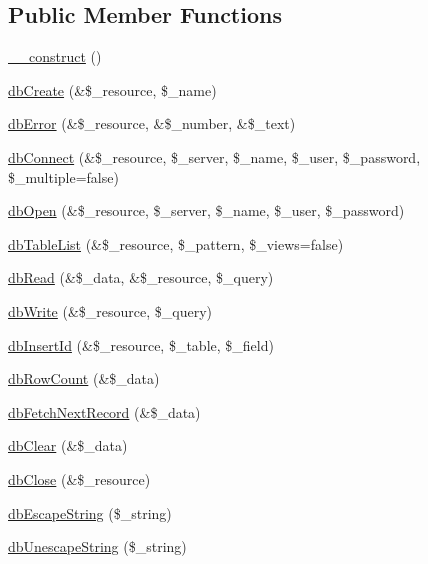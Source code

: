 \subsection*{Public Member Functions}
\begin{DoxyCompactItemize}
\item 
\hyperlink{classMySQL_a0fc0de8fcae17604dea97d9dfc12cfba}{\_\-\_\-construct} ()
\item 
\hyperlink{classMySQL_a54c2526c30d48b65d34c51581ddbabd2}{dbCreate} (\&\$\_\-resource, \$\_\-name)
\item 
\hyperlink{classMySQL_aca5c47b5530644a7877d32b1c04376f2}{dbError} (\&\$\_\-resource, \&\$\_\-number, \&\$\_\-text)
\item 
\hyperlink{classMySQL_a856919afd4bd3680410fdc98bd2eb865}{dbConnect} (\&\$\_\-resource, \$\_\-server, \$\_\-name, \$\_\-user, \$\_\-password, \$\_\-multiple=false)
\item 
\hyperlink{classMySQL_adba97d7d125e5772ea5ffa61dcb2b9e3}{dbOpen} (\&\$\_\-resource, \$\_\-server, \$\_\-name, \$\_\-user, \$\_\-password)
\item 
\hyperlink{classMySQL_a9da288ed9ff36dc572a68165de8b5839}{dbTableList} (\&\$\_\-resource, \$\_\-pattern, \$\_\-views=false)
\item 
\hyperlink{classMySQL_af85679f7912ab93293b31ad7609a7734}{dbRead} (\&\$\_\-data, \&\$\_\-resource, \$\_\-query)
\item 
\hyperlink{classMySQL_a5a7250d264b682ee2f4bdb14bb4aafd7}{dbWrite} (\&\$\_\-resource, \$\_\-query)
\item 
\hyperlink{classMySQL_aaf69bfa761be38520c7d72ae11506dac}{dbInsertId} (\&\$\_\-resource, \$\_\-table, \$\_\-field)
\item 
\hyperlink{classMySQL_a69ec9e11642d3ef0dddcecf95acc6907}{dbRowCount} (\&\$\_\-data)
\item 
\hyperlink{classMySQL_a2ebd12deacbdebd6ad876e279f34b4da}{dbFetchNextRecord} (\&\$\_\-data)
\item 
\hyperlink{classMySQL_a88191ab56d8ff3389b4519b712d74c32}{dbClear} (\&\$\_\-data)
\item 
\hyperlink{classMySQL_af37ce7304d8326337363a12631835d1b}{dbClose} (\&\$\_\-resource)
\item 
\hyperlink{classMySQL_a7f4b581ad71a3ee8922d51c9ef28a18c}{dbEscapeString} (\$\_\-string)
\item 
\hyperlink{classDbDriver_ac99fd7eba511d8799fcc447006179c72}{dbUnescapeString} (\$\_\-string)
\end{DoxyCompactItemize}


